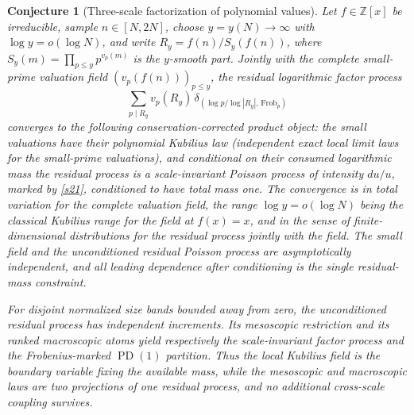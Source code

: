 \documentclass[11pt]{article}
\newtheorem{conjecture}{Conjecture}
\theoremstyle{definition}
\newcommand{\PD}{\operatorname{PD}}
\newcommand{\Z}{\mathbb Z}
\providecommand{\Z}{\mathbb Z}
\begin{document}
\begin{conjecture}[Three-scale factorization of polynomial values]\label{s22}
Let $f\in\Z[x]$ be irreducible, sample $n\in[N,2N]$, choose
$y=y(N)\to\infty$ with $\log y=o(\log N)$, and write
$R_y=f(n)/S_y(f(n))$, where $S_y(m)=\prod_{p\le y}p^{v_p(m)}$ is the $y$-smooth
part.  Jointly with the complete small-prime valuation field
$(v_p(f(n)))_{p\le y}$, the residual logarithmic factor process
\[
 \sum_{p\mid R_y}v_p(R_y)\,
 \delta_{\left(\log p/\log|R_y|,\,\mathrm{Frob}_p\right)}
\]
converges to the following conservation-corrected product object: the small valuations
have their polynomial Kubilius law (independent exact local limit laws for the small-prime valuations), and conditional on their consumed logarithmic mass
the residual process is a scale-invariant Poisson process of intensity $du/u$, marked by
\cref{s21}, conditioned to have total mass one.  The convergence is in total variation for the complete valuation field, the range $\log y=o(\log N)$ being the classical Kubilius range for the field at $f(x)=x$, and in the sense of finite-dimensional distributions for the residual process jointly with the field.  The small field and the unconditioned
residual Poisson process are asymptotically independent, and all leading dependence
after conditioning is the single residual-mass constraint.

For disjoint normalized size bands bounded away from zero, the unconditioned residual
process has independent increments.  Its mesoscopic restriction and its ranked
macroscopic atoms yield respectively the scale-invariant factor process and the
Frobenius-marked $\PD(1)$ partition.  Thus the local Kubilius field is the boundary
variable fixing the available mass, while the mesoscopic and macroscopic laws are two
projections of one residual process, and no additional cross-scale coupling survives.
\end{conjecture}
\end{document}
